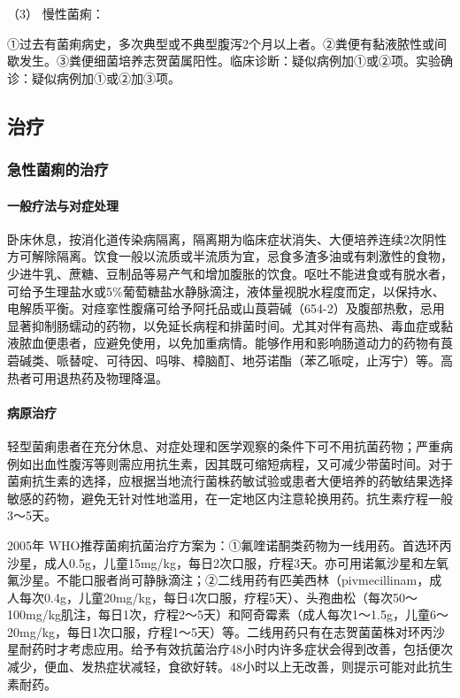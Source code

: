 \hypertarget{text00227.htmlux5cux23CHP7-9-2-4-2-3}{}
（3） 慢性菌痢：

①过去有菌痢病史，多次典型或不典型腹泻2个月以上者。②粪便有黏液脓性或间歇发生。③粪便细菌培养志贺菌属阳性。临床诊断：疑似病例加①或②项。实验确诊：疑似病例加①或②加③项。

\subsection{治疗}

\subsubsection{急性菌痢的治疗}

\paragraph{一般疗法与对症处理}

卧床休息，按消化道传染病隔离，隔离期为临床症状消失、大便培养连续2次阴性方可解除隔离。饮食一般以流质或半流质为宜，忌食多渣多油或有刺激性的食物，少进牛乳、蔗糖、豆制品等易产气和增加腹胀的饮食。呕吐不能进食或有脱水者，可给予生理盐水或5\%葡萄糖盐水静脉滴注，液体量视脱水程度而定，以保持水、电解质平衡。对痉挛性腹痛可给予阿托品或山莨菪碱（654-2）及腹部热敷，忌用显著抑制肠蠕动的药物，以免延长病程和排菌时间。尤其对伴有高热、毒血症或黏液脓血便患者，应避免使用，以免加重病情。能够作用和影响肠道动力的药物有莨菪碱类、哌替啶、可待因、吗啡、樟脑酊、地芬诺酯（苯乙哌啶，止泻宁）等。高热者可用退热药及物理降温。

\paragraph{病原治疗}

轻型菌痢患者在充分休息、对症处理和医学观察的条件下可不用抗菌药物；严重病例如出血性腹泻等则需应用抗生素，因其既可缩短病程，又可减少带菌时间。对于菌痢抗生素的选择，应根据当地流行菌株药敏试验或患者大便培养的药敏结果选择敏感的药物，避免无针对性地滥用，在一定地区内注意轮换用药。抗生素疗程一般3～5天。

2005年
WHO推荐菌痢抗菌治疗方案为：①氟喹诺酮类药物为一线用药。首选环丙沙星，成人0.5g，儿童15mg/kg，每日2次口服，疗程3天。亦可用诺氟沙星和左氧氟沙星。不能口服者尚可静脉滴注；②二线用药有匹美西林（pivmecillinam，成人每次0.4g，儿童20mg/kg，每日4次口服，疗程5天）、头孢曲松（每次50～100mg/kg肌注，每日1次，疗程2～5天）和阿奇霉素（成人每次1～1.5g，儿童6～20mg/kg，每日1次口服，疗程1～5天）等。二线用药只有在志贺菌菌株对环丙沙星耐药时才考虑应用。给予有效抗菌治疗48小时内许多症状会得到改善，包括便次减少，便血、发热症状减轻，食欲好转。48小时以上无改善，则提示可能对此抗生素耐药。

